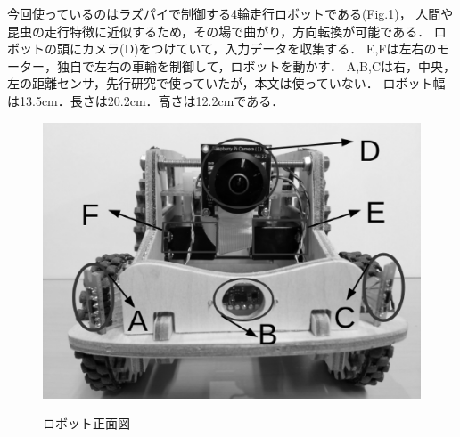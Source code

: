 今回使っているのはラズパイで制御する4輪走行ロボットである(Fig.\ref{robot_img})，
人間や昆虫の走行特徴に近似するため，その場で曲がり，方向転換が可能である．
ロボットの頭にカメラ(D)をつけていて，入力データを収集する．
E,Fは左右のモーター，独自で左右の車輪を制御して，ロボットを動かす．
A,B,Cは右，中央，左の距離センサ，先行研究で使っていたが，本文は使っていない．
ロボット幅は13.5cm．長さは20.2cm．高さは12.2cmである．

\vspace{-4mm}
\begin{figure}[htb]
    \centering
    \includegraphics[width=0.4\linewidth]{robot1.eps}
　　\label{robot_img}
    \caption{ロボット正面図}
\end{figure}




